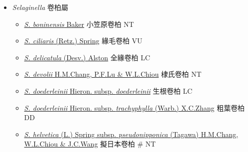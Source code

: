 
  \begin{itemize}
 \item[    ] \textit{Selaginella} 卷柏屬
                                
  \begin{itemize}
        \item[] \href{http://www.theplantlist.org/tpl1.1/search?q=Selaginella+boninensis}{\textit{S. boninensis} Baker}   小笠原卷柏   NT
        \item[] \href{http://www.theplantlist.org/tpl1.1/search?q=Selaginella+ciliaris}{\textit{S. ciliaris} (Retz.) Spring}   緣毛卷柏   VU
        \item[] \href{http://www.theplantlist.org/tpl1.1/search?q=Selaginella+delicatula}{\textit{S. delicatula} (Desv.) Alston}   全緣卷柏   LC
        \item[] \href{http://www.theplantlist.org/tpl1.1/search?q=Selaginella+devolii}{\textit{S. devolii} H.M.Chang, P.F.Lu \& W.L.Chiou}   棣氏卷柏   NT
        \item[] \href{http://www.theplantlist.org/tpl1.1/search?q=Selaginella+doederleinii+subsp.+doederleinii}{\textit{S. doederleinii} Hieron. subsp. \textit{doederleinii}}  
                                        生根卷柏   LC
        \item[] \href{http://www.theplantlist.org/tpl1.1/search?q=Selaginella+doederleinii+subsp.+trachyphylla}{\textit{S. doederleinii} Hieron. subsp. \textit{trachyphylla} (Warb.) X.C.Zhang}  
                                        粗葉卷柏   DD
        \item[] \href{http://www.theplantlist.org/tpl1.1/search?q=Selaginella+helvetica+subsp.+pseudonipponica}{\textit{S. helvetica} (L.) Spring subsp. \textit{pseudonipponica} (Tagawa) H.M.Chang, W.L.Chiou \& J.C.Wang}  
                                        擬日本卷柏  \# NT

\end{itemize}
\end{itemize}
